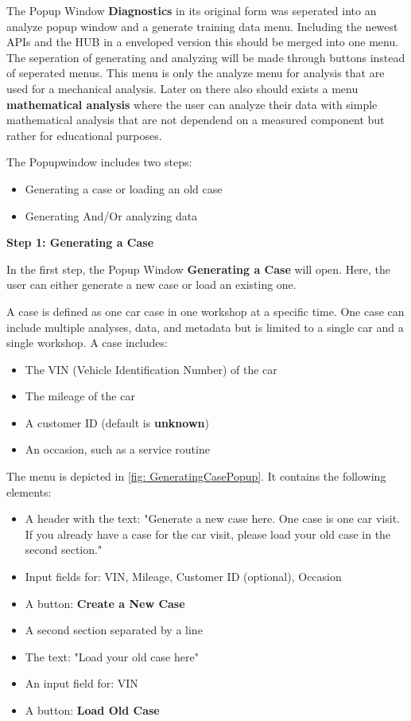 \documentclass[]{scrreprt}
\begin{document}
The Popup Window \textbf{Diagnostics} in its original form was seperated into an analyze popup window and a generate training data menu.
Including the newest APIs and the HUB in a enveloped version this should be merged into one menu. The seperation of generating and analyzing will be made through buttons instead of seperated menus.
This menu is only the analyze menu for analysis that are used for a mechanical analysis. Later on there also should exists a menu \textbf{mathematical analysis} where the user can analyze their data 
with simple mathematical analysis that are not dependend on a measured component but rather for educational purposes. 

The Popupwindow includes two steps: 

\begin{itemize}
    \item Generating a case or loading an old case 
    \item Generating And/Or analyzing data 
\end{itemize}

\textbf{Step 1: Generating a Case}

In the first step, the Popup Window \textbf{Generating a Case} will open. Here, the user can either generate a new case or load an existing one.

A case is defined as one car case in one workshop at a specific time. One case can include multiple analyses, 
data, and metadata but is limited to a single car and a single workshop. A case includes:
\begin{itemize}
    \item The VIN (Vehicle Identification Number) of the car
    \item The mileage of the car
    \item A customer ID (default is \textbf{unknown})
    \item An occasion, such as a service routine
\end{itemize}

The menu is depicted in \ref{fig: GeneratingCasePopup}. It contains the following elements:
\begin{itemize}
    \item A header with the text: "Generate a new case here. One case is one car visit. If you already have a case for the car visit, please load your old case in the second section."
    \item Input fields for: VIN, Mileage, Customer ID (optional), Occasion
    \item A button: \textbf{Create a New Case}
    \item A second section separated by a line
    \item The text: "Load your old case here"
    \item An input field for: VIN
    \item A button: \textbf{Load Old Case}
\end{itemize}
\end{document}
